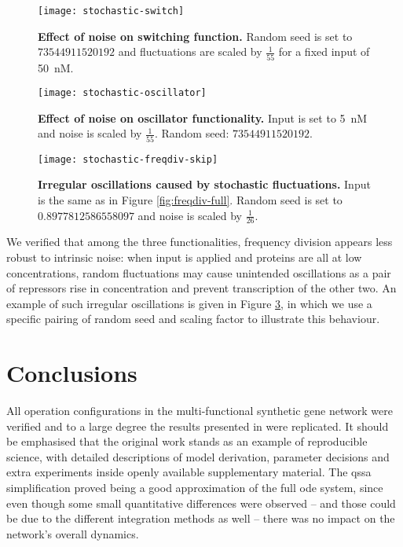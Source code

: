     \begin{figure}[!htb]
      \centering
      \texttt{[image: stochastic-switch]}
      \caption{\textbf{Effect of noise on switching function.} Random seed is set to $73544911520192$ and fluctuations are scaled by $\frac{1}{55}$ for a fixed input of \SI{50}{\nano M}.}
      \label{fig:stochastic-switch}
    \end{figure}

    \begin{figure}[!htb]
      \centering
      \texttt{[image: stochastic-oscillator]}
      \caption{\textbf{Effect of noise on oscillator functionality.} Input is set to \SI{5}{\nano M} and noise is scaled by $\frac{1}{55}$. Random seed: $73544911520192$.}
      \label{fig:stochastic-oscillator}
    \end{figure}

    \begin{figure}[!htb]
      \centering
      \texttt{[image: stochastic-freqdiv-skip]}
      \caption{\textbf{Irregular oscillations caused by stochastic fluctuations.} Input is the same as in Figure \ref{fig:freqdiv-full}. Random seed is set to $0.8977812586558097$ and noise is scaled by $\frac{1}{26}$.}
      \label{fig:stochastic-freqdiv-skip}
    \end{figure}

    We verified that among the three functionalities, frequency division appears less robust to intrinsic noise: when input is applied and proteins are all at low concentrations, random fluctuations may cause unintended oscillations as a pair of repressors rise in concentration and prevent transcription of the other two.
    An example of such irregular oscillations is given in Figure \ref{fig:stochastic-freqdiv-skip}, in which we use a specific pairing of random seed and scaling factor to illustrate this behaviour.


\section{Conclusions}

  All operation configurations in the multi-functional synthetic gene network were verified and to a large degree the results presented in \cite{multif} were replicated.
  It should be emphasised that the original work stands as an example of reproducible science, with detailed descriptions of model derivation, parameter decisions and extra experiments inside openly available supplementary material.
  The \ac{qssa} simplification proved being a good approximation of the full \ac{ode} system, since even though some small quantitative differences were observed -- and those could be due to the different integration methods as well -- there was no impact on the network's overall dynamics.

